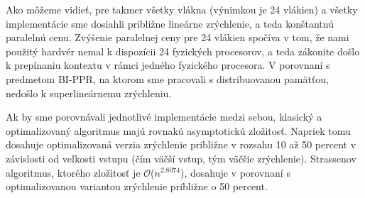 \documentclass[slovak]{article}
\begin{document}
Ako môžeme vidieť, pre takmer všetky vlákna (výnimkou je 24 vlákien) a všetky implementácie sme dosiahli približne lineárne zrýchlenie, a teda konštantnú paralelnú cenu. Zvýšenie paralelnej ceny pre 24 vlákien spočíva v tom, že nami použitý hardvér nemal k dispozícii 24 fyzických procesorov, a teda zákonite došlo k prepínaniu kontextu v rámci jedného fyzického procesora. V porovnaní s predmetom BI-PPR, na ktorom sme pracovali s distribuovanou pamätťou, nedošlo k superlineárnemu zrýchleniu. 

Ak by sme porovnávali jednotlivé implementácie medzi sebou, klasický a optimalizovaný algoritmus majú rovnakú asymptotickú zložitosť. Napriek tomu dosahuje optimalizovaná verzia zrýchlenie približne v rozsahu 10 až 50 percent v závislosti od veľkosti vstupu (čím väčší vstup, tým väčšie zrýchlenie). Strassenov algoritmus, ktorého zložitosť je $\mathcal{O}$($n^{2.8074}$), dosahuje v porovnaní s optimalizovanou variantou zrýchlenie približne o 50 percent.
\end{document}
